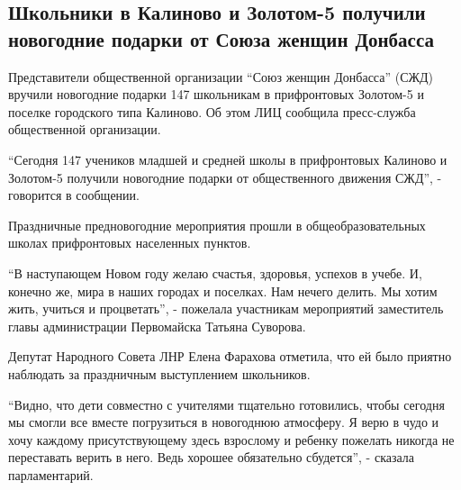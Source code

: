  
 
 
 
 
\subsection{Школьники в Калиново и Золотом-5 получили новогодние подарки от Союза женщин Донбасса}
\label{sec:20_12_2021.stz.news.lnr.lug_info.1.podarki_shkolnikam}


Представители общественной организации \enquote{Союз женщин Донбасса} (СЖД) вручили
новогодние подарки 147 школьникам в прифронтовых Золотом-5 и поселке городского
типа Калиново. Об этом ЛИЦ сообщила пресс-служба общественной организации.


\enquote{Сегодня 147 учеников младшей и средней школы в прифронтовых Калиново и
Золотом-5 получили новогодние подарки от общественного движения СЖД}, -
говорится в сообщении.

Праздничные предновогодние мероприятия прошли в общеобразовательных школах
прифронтовых населенных пунктов.

\enquote{В наступающем Новом году желаю счастья, здоровья, успехов в учебе. И, конечно
же, мира в наших городах и поселках. Нам нечего делить. Мы хотим жить, учиться
и процветать}, - пожелала участникам мероприятий заместитель главы
администрации Первомайска Татьяна Суворова.


Депутат Народного Совета ЛНР Елена Фарахова отметила, что ей было приятно
наблюдать за праздничным выступлением школьников.

\enquote{Видно, что дети совместно с учителями тщательно готовились, чтобы сегодня мы
смогли все вместе погрузиться в новогоднюю атмосферу. Я верю в чудо и хочу
каждому присутствующему здесь взрослому и ребенку пожелать никогда не
переставать верить в него. Ведь хорошее обязательно сбудется}, - сказала
парламентарий.

